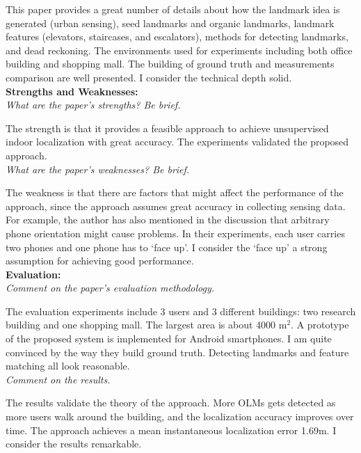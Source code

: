 \documentclass[11pt, oneside]{article}   	%
\begin{document}
This paper provides a great number of details about how the landmark idea is generated (urban sensing), seed landmarks and organic landmarks, landmark features (elevators, staircases, and escalators), methods for detecting landmarks, and dead reckoning. The environments used for experiments including both office building and shopping mall. The building of ground truth and measurements comparison are well presented. I consider the technical depth solid. \\



\noindent \textbf{Strengths and Weaknesses:}\\
\emph{What are the paper’s strengths? Be brief.}

The strength is that it provides a feasible approach to achieve unsupervised indoor localization with great accuracy. The experiments validated the proposed approach.\\



\noindent \emph{What are the paper's weaknesses? Be brief.}

The weakness is that there are factors that might affect the performance of the approach, since the approach assumes great accuracy in collecting sensing data. For example, the author has also mentioned in the discussion that arbitrary phone orientation might cause problems. In their experiments, each user carries two phones and one phone has to `face up'. I consider the `face up' a strong assumption for achieving good performance.\\


\noindent \textbf{Evaluation:}\\
\emph{Comment on the paper's evaluation methodology.}

The evaluation experiments include 3 users and 3 different buildings: two research building and one shopping mall. The largest area is about 4000 m$^2$. A prototype of the proposed system is implemented for Android smartphones. I am quite convinced by the way they build ground truth. Detecting landmarks and feature matching all look reasonable.\\

\noindent \emph{Comment on the results.}

The results validate the theory of the approach. More OLMs gets detected as more users walk around the building, and the localization accuracy improves over time. The approach achieves a mean instantaneous localization error 1.69m. I consider the results remarkable.\\
\end{document}
